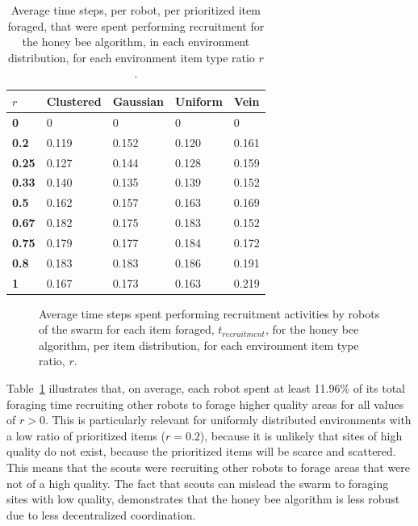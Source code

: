\begin{table}[!htbp]
\centering
\caption{Average time steps, per robot, per prioritized item foraged, that were spent performing recruitment for the honey bee algorithm, in each environment distribution, for each environment item type ratio $r$.}
\label{averagetimerecruitment}
\begin{tabular}{@{}lllll@{}}
\toprule
$r$            & \textbf{Clustered} & \textbf{Gaussian} & \textbf{Uniform} & \textbf{Vein} \\ \midrule
\textbf{0}        & 0        & 0       & 0      & 0   \\
\textbf{0.2}      & 0.119        & 0.152       & 0.120       & 0.161   \\
\textbf{0.25}     & 0.127        & 0.144       & 0.128      & 0.159   \\
\textbf{0.33} & 0.140        & 0.135       & 0.139      & 0.152   \\
\textbf{0.5}      & 0.162        & 0.157        & 0.163       & 0.169   \\
\textbf{0.67} & 0.182        & 0.175       & 0.183      & 0.152   \\
\textbf{0.75}     & 0.179        & 0.177       & 0.184      & 0.172   \\
\textbf{0.8}      & 0.183        & 0.183       & 0.186      & 0.191   \\
\textbf{1}        & 0.167        & 0.173       & 0.163      & 0.219   \\ \bottomrule
\end{tabular}
\end{table}


\begin{figure}[!htbp]
\centering
\resizebox{\textwidth}{!}{}
\caption{Average time steps spent performing recruitment activities by robots of the swarm for each item foraged, $t_{recruitment}$, for the honey bee algorithm, per item distribution, for each environment item type ratio, $r$.}
\label{fig:recruitmenttime}
\end{figure}

Table~\ref{averagetimerecruitment} illustrates that, on average, each robot spent at least 11.96\% of its total foraging time recruiting other robots to forage higher quality areas for all values of $r > 0$. This is particularly relevant for uniformly distributed environments with a low ratio of prioritized items ($r = 0.2$), because it is unlikely that sites of high quality do not exist, because the prioritized items will be scarce and scattered. This means that the scouts were recruiting other robots to forage areas that were not of a high quality. The fact that scouts can mislead the swarm to foraging sites with low quality, demonstrates that the honey bee algorithm is less robust due to less decentralized coordination.

